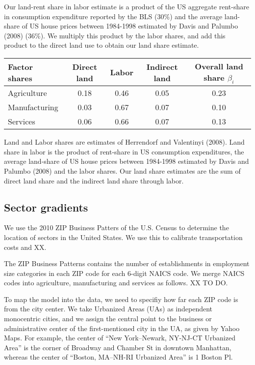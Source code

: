 \documentclass[12pt]{article}
\begin{document}
Our land-rent share in labor estimate is a product of the US aggregate rent-share in consumption expenditure reported by the BLS ($30\%$) and the average land-share of US house prices between 1984-1998 estimated by Davis and Palumbo (2008) (36\%). We multiply this product by the labor shares, and add this product to the direct land use to obtain our land share estimate.

\begin{table}[h!] \center
\begin{tabular}{l|ccc|c}
\hline 
Factor shares & Direct land & Labor & Indirect land & Overall land share $\beta_i$ \\ \hline
Agriculture & 0.18 & 0.46  & 0.05 & 0.23 \\
Manufacturing& 0.03 & 0.67 & 0.07 & 0.10  \\
Services    &  0.06 & 0.66 & 0.07 & 0.13 \\ \hline 
\end{tabular}

\noindent \footnotesize{Land and Labor shares are estimates of Herrendorf and Valentinyi (2008). Land share in labor is the product of rent-share in US consumption expenditures, the average land-share of US house prices between 1984-1998 estimated by Davis and Palumbo (2008) and the labor shares. Our land share estimates are the sum of direct land share and the indirect land share through labor.}
\end{table}





\subsection{Sector gradients}
We use the 2010 ZIP Business Patters of the U.S. Census to determine the location of sectors in the United States. We use this to calibrate transportation costs and XX.

The ZIP Business Patterns contains the number of establishments in employment size categories in each ZIP code for each 6-digit NAICS code. We merge NAICS codes into agriculture, manufacturing and services as follows. XX TO DO.

To map the model into the data, we need to specifiy how far each ZIP code is from the city center. We take Urbanized Areas (UAs) as independent monocentric cities, and we assign the central point to the business or administrative center of the first-mentioned city in the UA, as given by Yahoo Maps. For example, the center of ``New York–Newark, NY-NJ-CT Urbanized Area'' is the corner of Broadway and Chamber St in downtown Manhattan, whereas the center of ``Boston, MA–NH-RI Urbanized Area'' is 1 Boston Pl.
\end{document}

